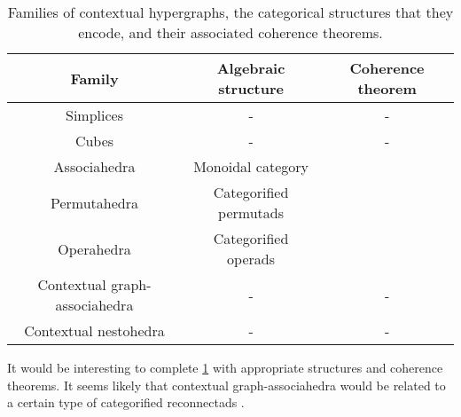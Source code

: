 \begin{table}[h!]
	\begin{center}
	\begin{tabular}{c|c|c}
	Family & Algebraic structure & Coherence theorem \\
	\hline
	Simplices & - & - \\
	Cubes & - & - \\
	Associahedra & Monoidal category & \cite{MacLane63} \\
	Permutahedra & Categorified permutads & \cite{CLA1} \\
	Operahedra & Categorified operads & \cite{DP15,CLA1} \\
	Contextual graph-associahedra & - & - \\
	Contextual nestohedra & - & - 
	\end{tabular}
	\end{center}
  \caption{Families of contextual hypergraphs, the categorical structures that they encode, and their associated coherence theorems.}
  \label{table:contextual-hyper}
\end{table}

\begin{rem}
  It would be interesting to complete \cref{table:contextual-hyper} with appropriate structures and coherence theorems.
  It seems likely that contextual graph-associahedra would be related to a certain type of categorified reconnectads \cite{DotsenkoKeilthyLyskov}.
\end{rem}




